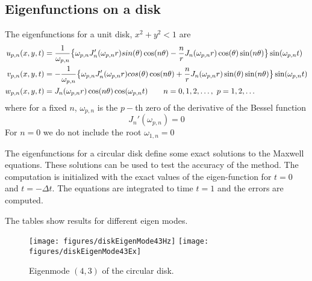 \subsection{Eigenfunctions on a disk}

The eigenfunctions for a unit disk, $x^2+y^2 < 1$ are
\begin{align*}
   u_{p,n}(x,y,t) &=  {1\over \omega_{p,n}}\big\{ 
              \omega_{p,n}J_n'(\omega_{p,n} r ) sin(\theta)\cos(n \theta)
                 - {n\over r} J_n(\omega_{p,n} r ) \cos(\theta) \sin(n \theta)  \big\}   \sin(\omega_{p,n} t) \\
   v_{p,n}(x,y,t) &= -{1\over \omega_{p,n}}\big\{ 
              \omega_{p,n}J_n'(\omega_{p,n} r ) cos(\theta)\cos(n \theta) 
                 + {n\over r} J_n(\omega_{p,n} r ) \sin(\theta) \sin(n \theta)  \big\}   \sin(\omega_{p,n} t)  \\
   w_{p,n}(x,y,t) & = J_n( \omega_{p,n} r ) \cos(n \theta) \cos(\omega_{p,n} t)
                  \qquad n=0,1,2,\ldots,~p=1,2,\ldots  
\end{align*}
where for a fixed $n$, $\omega_{p,n}$ is the $p-$th zero of the derivative of the Bessel function
\[
     J_n'(\omega_{p,n})=0
\]
For $n=0$ we do not include the root $\omega_{1,n}=0$

The eigenfunctions for a circular disk define some exact solutions to the Maxwell equations.
These solutions can be used to test the accuracy of the method.
The computation is initialized with the exact values of the eigen-function for $t=0$ and $t=-\Delta t$.
The equations are integrated to time $t=1$ and the errors are computed.

The tables show results for different eigen modes.







\renewcommand{\figWidth}{.45\linewidth}
\begin{figure}
\begin{center}
\texttt{[image: figures/diskEigenMode43Hz]}
\texttt{[image: figures/diskEigenMode43Ex]}
\end{center}
\caption{Eigenmode $(4,3)$ of the circular disk.}
\end{figure}

